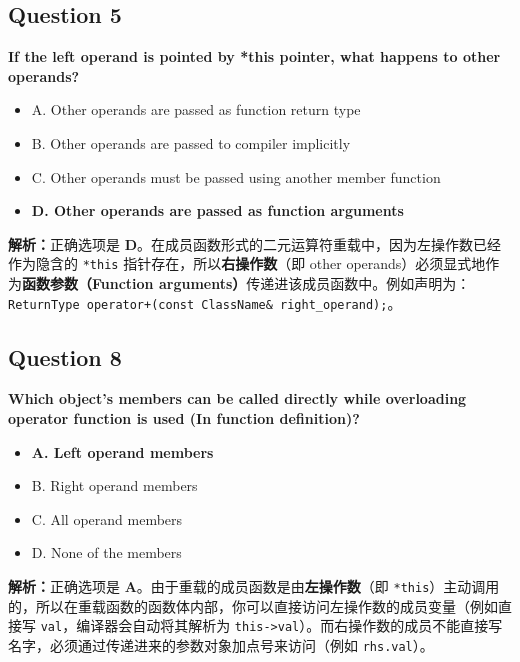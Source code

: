 \documentclass[11pt, a4paper]{article}
\begin{document}

\subsection*{Question 5}
\textbf{If the left operand is pointed by *this pointer, what happens to other operands?}
\begin{itemize}
    \item A. Other operands are passed as function return type
    \item B. Other operands are passed to compiler implicitly
    \item C. Other operands must be passed using another member function
    \item \textbf{D. Other operands are passed as function arguments}
\end{itemize}

\textbf{解析：}正确选项是 \textbf{D}。在成员函数形式的二元运算符重载中，因为左操作数已经作为隐含的 \texttt{*this} 指针存在，所以\textbf{右操作数}（即 other operands）必须显式地作为\textbf{函数参数（Function arguments）}传递进该成员函数中。例如声明为：\texttt{ReturnType operator+(const ClassName\& right\_operand);}。


\subsection*{Question 8}
\textbf{Which object’s members can be called directly while overloading operator function is used (In function definition)?}
\begin{itemize}
    \item \textbf{A. Left operand members}
    \item B. Right operand members
    \item C. All operand members
    \item D. None of the members
\end{itemize}

\textbf{解析：}正确选项是 \textbf{A}。由于重载的成员函数是由\textbf{左操作数}（即 \texttt{*this}）主动调用的，所以在重载函数的函数体内部，你可以直接访问左操作数的成员变量（例如直接写 \texttt{val}，编译器会自动将其解析为 \texttt{this->val}）。而右操作数的成员不能直接写名字，必须通过传递进来的参数对象加点号来访问（例如 \texttt{rhs.val}）。

\newpage %
\end{document}
